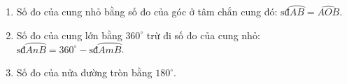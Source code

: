 \begin{enumerate}
\item Số đo của cung nhỏ bằng số đo của góc ở tâm chắn cung đó: $\text{sđ}\wideparen{AB} = \widehat{AOB}$.
\item Số đo của cung lớn bằng $360^\circ$ trừ đi số đo của cung nhỏ: $\text{sđ}\wideparen{AnB} = 360^\circ - \text{sđ}\wideparen{AmB}$.
\item Số đo của nửa đường tròn bằng $180^\circ$.
\end{enumerate}
